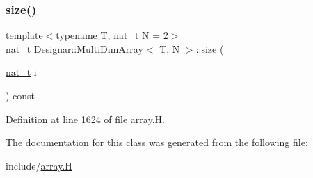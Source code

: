 \subsubsection{\texorpdfstring{size()}{size()}}
{\footnotesize\ttfamily template$<$typename T, nat\+\_\+t N = 2$>$ \\
\hyperlink{namespace_designar_aa72662848b9f4815e7bf31a7cf3e33d1}{nat\+\_\+t} \hyperlink{class_designar_1_1_multi_dim_array}{Designar\+::\+Multi\+Dim\+Array}$<$ T, N $>$\+::size (\begin{DoxyParamCaption}\item[{\hyperlink{namespace_designar_aa72662848b9f4815e7bf31a7cf3e33d1}{nat\+\_\+t}}]{i }\end{DoxyParamCaption}) const\hspace{0.3cm}{\ttfamily [inline]}}



Definition at line 1624 of file array.\+H.



The documentation for this class was generated from the following file\+:\begin{DoxyCompactItemize}
\item 
include/\hyperlink{array_8_h}{array.\+H}\end{DoxyCompactItemize}
